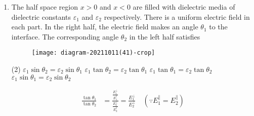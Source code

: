 \begin{enumerate}
	{}
	\begin{tasks}(4)
		\task[\textbf{a.}]  $c(2 \hat{i}+\hat{j}+\hat{k})$
		\task[\textbf{b.}] $c(\hat{i}+2 \hat{j}+2 \hat{k})$
		\task[\textbf{c.}] $c\left(\frac{1}{2} \hat{i}+\hat{j}+\hat{k}\right)$
		\task[\textbf{d.}] $c\left(\hat{i}+\frac{1}{2} \hat{j}+\frac{1}{2} \hat{k}\right)$
	\end{tasks}
\begin{answer}$\left. \right. $
	\begin{figure}[H]
		\centering
		\texttt{[image: diagram-20211011(34)-crop]}
	\end{figure}
	\begin{align*}
	E_{1}^{\prime \prime}&=c(\hat{j}+\hat{k})=E_{2}^{\prime \prime}\\
	D_{1}^{\perp}&=D_{2}^{\perp} \Rightarrow \epsilon_{1} E_{1}^{\perp}=\epsilon_{2} E_{2}^{\perp} \Rightarrow E_{2}^{1}=\frac{\epsilon_{1}}{\epsilon_{2}} E_{1}^{\perp}\\
	\Rightarrow E_{2}^{\perp}&=\frac{1}{2} c \hat{i} \Rightarrow \vec{E}_{2}=c\left(\frac{1}{2} \hat{i}+\hat{j}+\hat{k}\right)
	\end{align*}
	So the correct answer is \textbf{Option (c)}
\end{answer}
	\item  The half space region $x>0$ and $x<0$ are filled with dielectric media of dielectric constants $\varepsilon_{1}$ and $\varepsilon_{2}$ respectively. There is a uniform electric field in each part. In the right half, the electric field makes an angle $\theta_{1}$ to the interface. The corresponding angle $\theta_{2}$ in the left half satisfies
	{{}}
	\begin{figure}[H]
		\centering
		\texttt{[image: diagram-20211011(41)-crop]}
	\end{figure}
	\begin{tasks}(2)
		\task[\textbf{a.}] $\varepsilon_{1} \sin \theta_{2}=\varepsilon_{2} \sin \theta_{1}$
		\task[\textbf{b.}] $\varepsilon_{1} \tan \theta_{2}=\varepsilon_{2} \tan \theta_{1}$
		\task[\textbf{c.}] $\varepsilon_{1} \tan \theta_{1}=\varepsilon_{2} \tan \theta_{2}$
		\task[\textbf{d.}] $\varepsilon_{1} \sin \theta_{1}=\varepsilon_{2} \sin \theta_{2}$
	\end{tasks}
\begin{answer}
	\begin{align*}
	\frac{\tan \theta_{1}}{\tan \theta_{2}}&=\frac{\frac{E_{1}^{\perp}}{E_{1}^{\|}}}{\frac{E_{2}^{\perp}}{E_{2}^{\|}}}=\frac{E_{1}^{\perp}}{E_{2}^{\perp}} \quad\left(\because E_{1}^{\|}=E_{2}^{\|}\right)\\

\end{align*}
\end{answer}
\end{enumerate}
